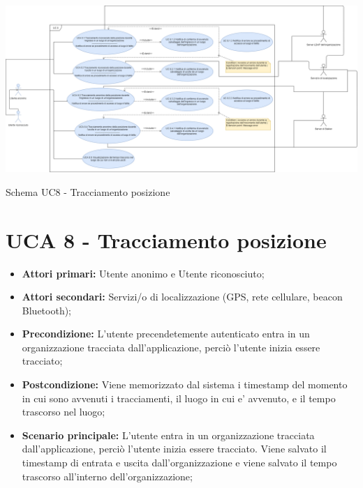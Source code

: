 \centering\includegraphics[scale=0.28]{sezioni/UseCase/Immagini/UCA8.png}
\caption{Schema UC8 - Tracciamento posizione}
\section{UCA 8 - Tracciamento posizione}%
\begin{itemize}
\item \textbf{Attori primari:} Utente anonimo e Utente riconosciuto;
\item \textbf{Attori secondari:} Servizi/o di localizzazione (GPS, rete cellulare, beacon Bluetooth);
\item \textbf{Precondizione:} L'utente precendetemente autenticato entra in un organizzazione tracciata dall'applicazione, perciò l'utente inizia essere tracciato;
\item \textbf{Postcondizione:} Viene memorizzato dal sistema i timestamp del momento in cui sono avvenuti i tracciamenti, il luogo in cui e’ avvenuto, e il tempo trascorso nel luogo;
\item \textbf{Scenario principale:} L'utente entra in un organizzazione tracciata dall'applicazione, perciò l'utente inizia essere tracciato. Viene salvato il timestamp di entrata e uscita dall'organizzazione e viene salvato il tempo trascorso all'interno dell'organizzazione;
\end{itemize}

